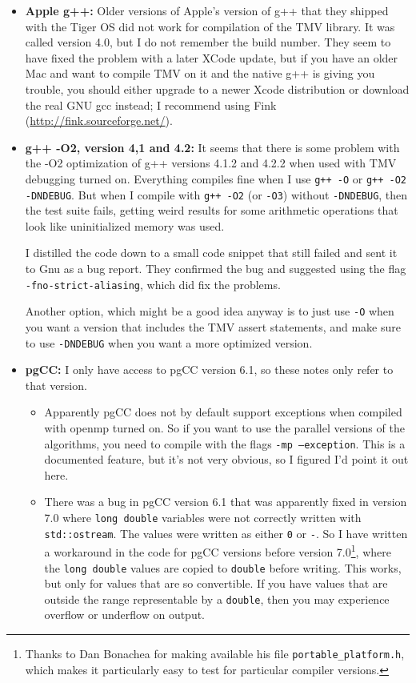 \documentclass[twoside,letterpaper,11pt]{article}
\renewcommand{\tt}[1]{{\lstinline {#1}}}
\begin{document}
\begin{itemize}
\item {\bf Apple g++:}
Older versions of Apple's version of g++ that they shipped with the Tiger OS did not work for 
compilation of the TMV library.  It was called version 4.0, but I do not remember the build number.
They seem to have fixed the problem with a later XCode update,
but if you have an older Mac and want to compile TMV on it and the native g++ 
is giving you trouble,
you should either upgrade to a newer Xcode distribution or download the real GNU gcc instead;  
I recommend using Fink (\url{http://fink.sourceforge.net/}).

\item {\bf g++ -O2, version 4,1 and 4.2:}
It seems that there is some problem with the -O2 optimization of g++ versions 4.1.2 and 4.2.2
when used with TMV debugging turned on.  Everything compiles fine when I use
\texttt{g++ -O} or \texttt{g++ -O2 -DNDEBUG}.  But when I compile with \texttt{g++ -O2} (or \texttt{-O3}) without
\texttt{-DNDEBUG}, then the test suite fails, getting weird results for some arithmetic operations
that look like uninitialized memory was used.  

I distilled the code down to a small code snippet that still failed 
and sent it to Gnu as a bug report.
They confirmed the bug and suggested
using the flag \texttt{-fno-strict-aliasing}, which did fix the problems.

Another option, which might be a good idea anyway is to just use \texttt{-O} 
when you want a version that 
includes the TMV assert statements, and make sure to use \texttt{-DNDEBUG} 
when you want a more optimized version.

\item {\bf pgCC:}
I only have access to pgCC version 6.1, so these notes only refer to that version.
\begin{itemize}
\item
Apparently pgCC does not by default support exceptions when compiled 
with openmp turned on.  
So if you want to use the parallel versions of the algorithms,
you need to compile with the flags \texttt{-mp --exception}.  This is a documented feature,
but it's not very obvious, so I figured I'd point it out here.

\item 
There was a bug in pgCC version 6.1 that was apparently fixed in version 7.0 where
\tt{long double} variables were not correctly written with \tt{std::ostream}.  The values
were written as either \tt{0} or \tt{-}.  So I have written a workaround in the code for
pgCC versions before version 7.0\footnote{
Thanks to Dan Bonachea for making available his file \texttt{portable\_platform.h},
which makes it particularly easy to test for particular compiler versions.},
where the \tt{long double} values are copied to 
\tt{double} before writing.  This works, but only for values that are so convertible.
If you have values that are outside the range representable by a \tt{double}, then 
you may experience overflow or underflow on output.


\end{itemize}
\end{itemize}
\end{document}
